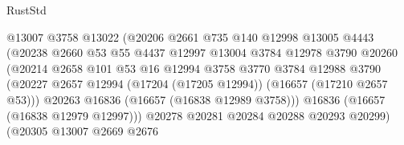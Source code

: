 \begin{lexlean}{RustStd}
\begin{coremodule}
                                      @13007
                                      @3758
                                      @13022
                                      (@20206
                                        @2661
                                        @735
                                        @140
                                        @12998
                                        @13005
                                        @4443
                                        (@20238
                                          @2660
                                          @53
                                          @55
                                          @4437
                                          @12997
                                          @13004
                                          @3784
                                          @12978
                                          @3790
                                          @20260
                                          (@20214
                                            @2658
                                            @101
                                            @53
                                            @16
                                            @12994
                                            @3758
                                            @3770
                                            @3784
                                            @12988
                                            @3790
                                            (@20227
                                              @2657
                                              @12994
                                              (@17204 (@17205 @12994))
                                              (@16657 (@17210 @2657 @53)))
                                            @20263
                                            @16836
                                            (@16657 (@16838 @12989 @3758)))
                                          @16836
                                          (@16657 (@16838 @12979 @12997)))
                                        @20278
                                        @20281
                                        @20284
                                        @20288
                                        @20293
                                        @20299)
                                      (@20305
                                        @13007
                                        @2669
                                        @2676

\end{coremodule}
\end{lexlean}
